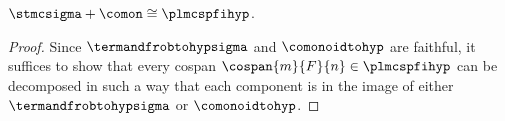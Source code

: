 \begin{theorem}
    \(\stmcsigma + \comon \cong \plmcspfihyp\).
\end{theorem}
\begin{proof}
    Since \(\termandfrobtohypsigma\) and \(\comonoidtohyp\) are faithful, it suffices to show that every cospan \(\cospan{m}{F}{n} \in \plmcspfihyp\) can be decomposed in such a way that each component is in the image of either \(\termandfrobtohypsigma\) or \(\comonoidtohyp\).
\end{proof}
